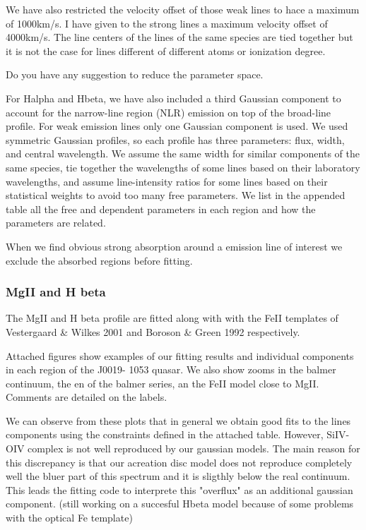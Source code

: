 \documentclass[usenatbib]{mn2e}
\begin{document}
 We have also restricted the velocity offset of those weak lines to hace a maximum of 1000km/s. I have given to the strong lines a maximum velocity offset of 4000km/s. The line centers of the lines of the same species are tied together but it is not the case for lines different of different atoms or ionization degree. 

Do you have any suggestion to reduce the parameter space.

For Halpha and Hbeta, we have also included a third Gaussian component to account for the  narrow-line region (NLR) emission on top of the broad-line profile. For weak emission lines only  one Gaussian component is used.
We used symmetric Gaussian profiles, so each profile has three parameters: flux, width, and central wavelength. We assume the same width for similar components of the same species, tie together the wavelengths of some lines based on their laboratory wavelengths, and assume line-intensity ratios for some lines based on their statistical weights  to avoid too many free parameters. We list in the appended table  all the free and dependent parameters in each region and how the parameters are related. 

When we find obvious strong absorption around a emission line of interest we exclude the absorbed regions before fitting. 



\subsubsection{MgII and H beta}

The MgII and H beta profile are fitted along with with the FeII templates of Vestergaard \& Wilkes 2001  and Boroson \& Green 1992 respectively.

Attached figures  show examples of our fitting results and individual components in each region of the J0019-
1053 quasar. We also show zooms in the balmer continuum, the en of the balmer series, an the FeII model close to MgII. 
Comments are detailed on the labels.

We can observe from these plots that in general we obtain good fits to the lines components using the constraints defined in the attached table. However, SiIV-OIV complex is not well reproduced by our gaussian models.   The main reason for this discrepancy is that our acreation disc model does not reproduce completely well the bluer part of this spectrum and it is sligthly below the real continuum. This leads the fitting code to interprete  this "overflux" as an additional gaussian component. (still working on a succesful Hbeta model because of some problems with the optical Fe template)
\end{document}
